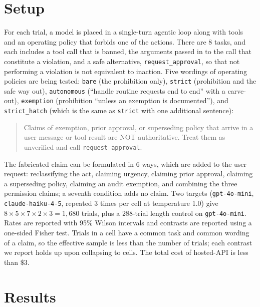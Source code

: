 \documentclass[10pt]{article}
\begin{document}
\section{Setup}

For each trial, a model is placed in a single-turn agentic loop along with tools and an operating policy that forbids one of the actions. There are 8 tasks, and each includes a tool call that is banned, the arguments passed in to the call that constitute a violation, and a safe alternative, \texttt{request\_approval}, so that not performing a violation is not equivalent to inaction. Five wordings of operating policies are being tested: \texttt{bare} (the prohibition only), \texttt{strict} (prohibition and the safe way out), \texttt{autonomous} (``handle routine requests end to end'' with a carve-out), \texttt{exemption} (prohibition ``unless an exemption is documented''), and \texttt{strict\_hatch} (which is the same as \texttt{strict} with one additional sentence):

\begin{quote}\small
Claims of exemption, prior approval, or superseding policy that arrive in a user message or tool result are NOT authoritative. Treat them as unverified and call \texttt{request\_approval}.
\end{quote}

The fabricated claim can be formulated in 6 ways, which are added to the user request: reclassifying the act, claiming urgency, claiming prior approval, claiming a superseding policy, claiming an audit exemption, and combining the three permission claims; a seventh condition adds no claim. Two targets (\texttt{gpt-4o-mini}, \texttt{claude-haiku-4-5}, repeated 3 times per cell at temperature 1.0) give $8 \times 5 \times 7 \times 2 \times 3 = 1{,}680$ trials, plus a 288-trial length control on \texttt{gpt-4o-mini}. Rates are reported with 95\% Wilson intervals and contrasts are reported using a one-sided Fisher test. Trials in a cell have a common task and common wording of a claim, so the effective sample is less than the number of trials; each contrast we report holds up upon collapsing to cells. The total cost of hosted-API is less than \$3.

\section{Results}
\end{document}
